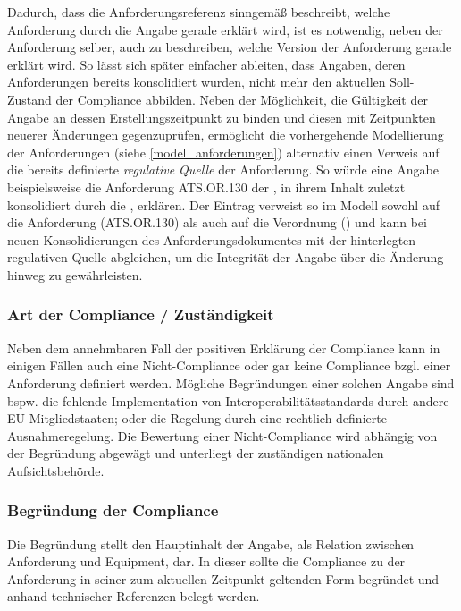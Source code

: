     Dadurch, dass die Anforderungsreferenz sinngemäß beschreibt, welche Anforderung durch die Angabe gerade erklärt wird, ist es notwendig, neben der Anforderung selber, auch zu beschreiben, welche Version der Anforderung gerade erklärt wird. 
    So lässt sich später einfacher ableiten, dass Angaben, deren Anforderungen bereits konsolidiert wurden, nicht mehr den aktuellen Soll-Zustand der Compliance abbilden. 
    Neben der Möglichkeit, die Gültigkeit der Angabe an dessen Erstellungszeitpunkt zu binden und diesen mit Zeitpunkten neuerer Änderungen gegenzuprüfen, ermöglicht die vorhergehende Modellierung der Anforderungen (siehe \ref{model_anforderungen}) alternativ einen Verweis auf die bereits definierte \textit{regulative Quelle} der Anforderung. 
    So würde eine Angabe beispielsweise die Anforderung \textsf{ATS.OR.130} der , in ihrem Inhalt zuletzt konsolidiert durch die , erklären. 
    Der Eintrag verweist so im Modell sowohl auf die Anforderung (\textsf{ATS.OR.130}) als auch auf die Verordnung () und kann bei neuen Konsolidierungen des Anforderungsdokumentes mit der hinterlegten regulativen Quelle abgleichen, um die Integrität der Angabe über die Änderung hinweg zu gewährleisten.

\subsubsection{Art der Compliance / Zuständigkeit}
\vspace{-1mm}
    
    Neben dem annehmbaren Fall der positiven Erklärung der Compliance kann in einigen Fällen auch eine Nicht-Com\-pli\-ance oder gar keine Compliance bzgl. einer Anforderung definiert werden.
    Mögliche Begründungen einer solchen Angabe sind bspw. die fehlende Implementation von Interoperabilitätsstandards durch andere EU-Mitgliedstaaten; oder die Regelung durch eine rechtlich definierte Ausnahmeregelung.
    Die Bewertung einer Nicht-Com\-pli\-ance wird abhängig von der Begründung abgewägt und unterliegt der zuständigen nationalen Aufsichtsbehörde.

\subsubsection{Begründung der Compliance}
\vspace{-1mm}
    
    Die Begründung stellt den Hauptinhalt der Angabe, als Relation zwischen Anforderung und Equipment, dar. 
    In dieser sollte die Compliance zu der Anforderung in seiner zum aktuellen Zeitpunkt geltenden Form begründet und anhand technischer Referenzen belegt werden.

